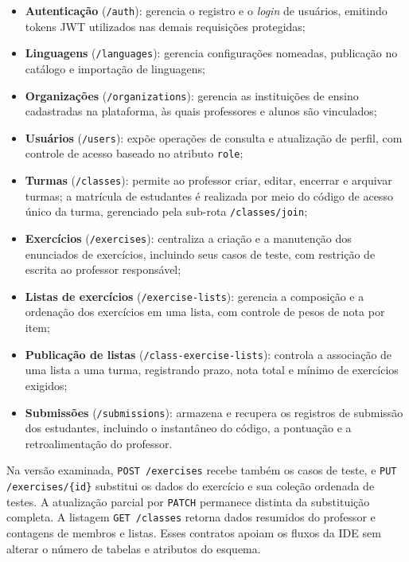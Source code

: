 \begin{itemize}
    \item \textbf{Autenticação} (\texttt{/auth}): gerencia o registro e o \textit{login} de usuários, emitindo tokens JWT utilizados nas demais requisições protegidas;
    \item \textbf{Linguagens} (\texttt{/languages}): gerencia configurações nomeadas, publicação no catálogo e importação de linguagens;
    \item \textbf{Organizações} (\texttt{/organizations}): gerencia as instituições de ensino cadastradas na plataforma, às quais professores e alunos são vinculados;
    \item \textbf{Usuários} (\texttt{/users}): expõe operações de consulta e atualização de perfil, com controle de acesso baseado no atributo \texttt{role};
    \item \textbf{Turmas} (\texttt{/classes}): permite ao professor criar, editar, encerrar e arquivar turmas; a matrícula de estudantes é realizada por meio do código de acesso único da turma, gerenciado pela sub-rota \texttt{/classes/join};
    \item \textbf{Exercícios} (\texttt{/exercises}): centraliza a criação e a manutenção dos enunciados de exercícios, incluindo seus casos de teste, com restrição de escrita ao professor responsável;
    \item \textbf{Listas de exercícios} (\texttt{/exercise-lists}): gerencia a composição e a ordenação dos exercícios em uma lista, com controle de pesos de nota por item;
    \item \textbf{Publicação de listas} (\texttt{/class-exercise-lists}): controla a associação de uma lista a uma turma, registrando prazo, nota total e mínimo de exercícios exigidos;
    \item \textbf{Submissões} (\texttt{/submissions}): armazena e recupera os registros de submissão dos estudantes, incluindo o instantâneo do código, a pontuação e a retroalimentação do professor.
\end{itemize}

Na versão examinada, \texttt{POST /exercises} recebe também os casos de teste, e \texttt{PUT /exercises/}\allowbreak\texttt{\{id\}} substitui os dados do exercício e sua coleção ordenada de testes. A atualização parcial por \texttt{PATCH} permanece distinta da substituição completa. A listagem \texttt{GET /classes} retorna dados resumidos do professor e contagens de membros e listas. Esses contratos apoiam os fluxos da IDE sem alterar o número de tabelas e atributos do esquema.

